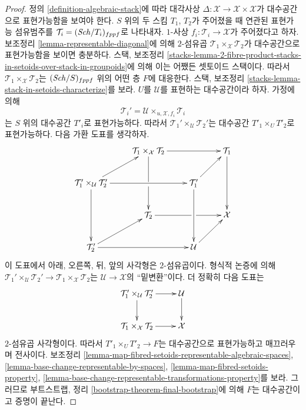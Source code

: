 \begin{proof}
정의 \ref{definition-algebraic-stack}에 따라 대각사상
$\Delta : \mathcal{X} \to \mathcal{X} \times \mathcal{X}$가
대수공간으로 표현가능함을 보여야 한다. $S$ 위의 두 스킴 $T_1$, $T_2$가
주어졌을 때 연관된 표현가능 섬유범주를
$\mathcal{T}_i = (\mathit{Sch}/T_i)_{fppf}$로 나타내자. $1$-사상
$f_i : \mathcal{T}_i \to \mathcal{X}$가 주어졌다고 하자. 보조정리
\ref{lemma-representable-diagonal}에 의해 $2$-섬유곱
$\mathcal{T}_1 \times_\mathcal{X} \mathcal{T}_2$가 대수공간으로
표현가능함을 보이면 충분하다. 스택, 보조정리
\ref{stacks-lemma-2-fibre-product-stacks-in-setoids-over-stack-in-groupoids}에
의해 이는 어쨌든 셋토이드 스택이다. 따라서
$\mathcal{T}_1 \times_\mathcal{X} \mathcal{T}_2$는
$(\mathit{Sch}/S)_{fppf}$ 위의 어떤 층 $F$에 대응한다. 스택, 보조정리
\ref{stacks-lemma-stack-in-setoids-characterize}를 보라. $U$를
$\mathcal{U}$를 표현하는 대수공간이라 하자. 가정에 의해
$$
\mathcal{T}_i' = \mathcal{U} \times_{u, \mathcal{X}, f_i} \mathcal{T}_i
$$
는 $S$ 위의 대수공간 $T'_i$로 표현가능하다. 따라서
$\mathcal{T}_1' \times_\mathcal{U} \mathcal{T}_2'$는 대수공간
$T'_1 \times_U T'_2$로 표현가능하다. 다음 가환 도표를 생각하자.
$$
\xymatrix{
&
\mathcal{T}_1 \times_{\mathcal X} \mathcal{T}_2 \ar[rr]\ar'[d][dd] & &
\mathcal{T}_1 \ar[dd] \\
\mathcal{T}_1' \times_\mathcal{U} \mathcal{T}_2' \ar[ur]\ar[rr]\ar[dd] & &
\mathcal{T}_1' \ar[ur]\ar[dd] \\
&
\mathcal{T}_2 \ar'[r][rr] & &
\mathcal X \\
\mathcal{T}_2' \ar[rr]\ar[ur] & &
\mathcal{U} \ar[ur] }
$$
이 도표에서 아래, 오른쪽, 뒤, 앞의 사각형은 $2$-섬유곱이다. 형식적
논증에 의해
$\mathcal{T}_1' \times_\mathcal{U} \mathcal{T}_2' \to
\mathcal{T}_1 \times_{\mathcal X} \mathcal{T}_2$는
$\mathcal{U} \to \mathcal{X}$의 ``밑변환''이다. 더 정확히 다음 도표는
$$
\xymatrix{
\mathcal{T}_1' \times_\mathcal{U} \mathcal{T}_2' \ar[d] \ar[r] &
\mathcal{U} \ar[d] \\
\mathcal{T}_1 \times_{\mathcal X} \mathcal{T}_2 \ar[r] &
\mathcal{X}
}
$$
$2$-섬유곱 사각형이다. 따라서 $T'_1 \times_U T'_2 \to F$는 대수공간으로
표현가능하고 매끄러우며 전사이다. 보조정리
\ref{lemma-map-fibred-setoids-representable-algebraic-spaces},
\ref{lemma-base-change-representable-by-spaces},
\ref{lemma-map-fibred-setoids-property},
\ref{lemma-base-change-representable-transformations-property}를 보라.
그러므로 부트스트랩, 정리 \ref{bootstrap-theorem-final-bootstrap}에 의해
$F$는 대수공간이고 증명이 끝난다.
\end{proof}

